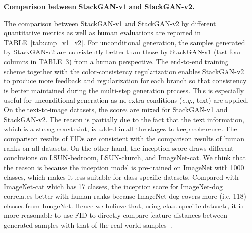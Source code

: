 \documentclass[10pt,journal,letterpaper,compsoc]{IEEEtran}
\begin{document}
\textbf{Comparison between StackGAN-v1 and StackGAN-v2. } 
{
The comparison between StackGAN-v1 and StackGAN-v2 by different quantitative metrics as well as human evaluations are reported in TABLE~\ref{tab:cmp_v1_v2}. For unconditional generation, the samples generated by StackGAN-v2 are consistently better than those by StackGAN-v1 (last four columns in TABLE~3) from a human perspective. The end-to-end training scheme together with the color-consistency regularization enables StackGAN-v2 to produce more feedback and regularization for each branch so that consistency is better maintained during the multi-step generation process.  This is especially useful for unconditional generation as no extra conditions (\emph{e.g}., text) are applied.  On the text-to-image datasets, the scores are mixed for StackGAN-v1 and StackGAN-v2. The reason is partially due to the fact that the text information, which is a strong constraint, is added in all the stages to keep coherence. The comparison results of FIDs are consistent with the comparison results of human ranks on all datasets. On the other hand, the inception score draws different conclusions on LSUN-bedroom, LSUN-church, and ImageNet-cat. We think that the reason is because the inception model is pre-trained on ImageNet with 1000 classes, which makes it less suitable for class-specific datasets.  Compared with ImageNet-cat which has 17 classes, the inception score for ImageNet-dog correlates better with human ranks because ImageNet-dog covers more (i.e. 118) classes from ImageNet. Hence we believe that, using class-specific datasets, it is more reasonable to use FID to directly compare feature distances between generated samples with that of the real world samples~\cite{HeuselRUNH17}. 



}
\end{document}
